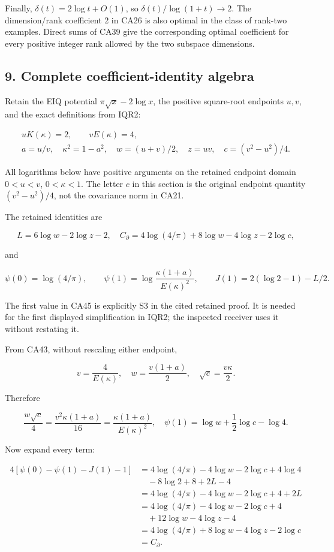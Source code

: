 \documentclass[11pt]{article}
\begin{document}
Finally, \(\delta(t)=2\log t+O(1)\), so \(\delta(t)/\log(1+t)\to2\). The dimension/rank coefficient 2 in CA26 is also optimal in the class of rank-two examples. Direct sums of CA39 give the corresponding optimal coefficient for every positive integer rank allowed by the two subspace dimensions.

\subsection{9. Complete coefficient-identity algebra}\label{complete-coefficient-identity-algebra}

Retain the EIQ potential \(\pi\sqrt x-2\log x\), the positive square-root endpoints \(u,v\), and the exact definitions from IQR2:

\[
\begin{gathered}uK(\kappa)=2,\qquad vE(\kappa)=4,\\
a=u/v,\quad \kappa^2=1-a^2,
\quad w=(u+v)/2,\quad z=uv,\quad c=(v^2-u^2)/4.
\end{gathered}\tag{CA43}
\]

All logarithms below have positive arguments on the retained endpoint domain \(0<u<v\), \(0<\kappa<1\). The letter \(c\) in this section is the original endpoint quantity \((v^2-u^2)/4\), not the covariance norm in CA21.

The retained identities are

\[
L=6\log w-2\log z-2,
\quad C_\partial=4\log(4/\pi)+8\log w-4\log z-2\log c,
\tag{CA44}
\]

and

\[
\psi(0)=\log(4/\pi),\qquad
\psi(1)=\log\frac{\kappa(1+a)}{E(\kappa)^2},
\qquad J(1)=2(\log2-1)-L/2.
\tag{CA45}
\]

The first value in CA45 is explicitly S3 in the cited retained proof. It is needed for the first displayed simplification in IQR2; the inspected receiver uses it without restating it.

From CA43, without rescaling either endpoint,

\[
v=\frac4{E(\kappa)},\quad
w=\frac{v(1+a)}2,\quad
\sqrt c=\frac{v\kappa}2.
\]

Therefore

\[
\frac{w\sqrt c}{4}
=\frac{v^2\kappa(1+a)}{16}
=\frac{\kappa(1+a)}{E(\kappa)^2},
\quad
\psi(1)=\log w+\frac12\log c-\log4.
\tag{CA46}
\]

Now expand every term:

\[
\begin{aligned}
4[\psi(0)-\psi(1)-J(1)-1]
&=4\log(4/\pi)
-4\log w-2\log c+4\log4\\
&\quad-8\log2+8+2L-4\\
&=4\log(4/\pi)-4\log w-2\log c+4+2L\\
&=4\log(4/\pi)-4\log w-2\log c+4\\
&\quad+12\log w-4\log z-4\\
&=4\log(4/\pi)+8\log w-4\log z-2\log c\\
&=C_\partial.
\end{aligned}
\tag{CA47}
\]
\end{document}
